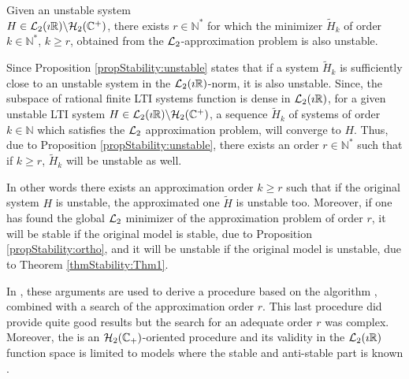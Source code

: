 \documentclass[graybox]{svmult}
\begin{document}
\begin{theorem} \label{thmStability:Thm1}
	Given an unstable system \\ $H\in {\mathcal{L}_{2}}(\imath\mathbb{R})\backslash {\mathcal{H}_{2}}(\mathbb{C}^+)$,  there exists  $r\in \mathbb{N}^*$ for which  the minimizer $\tilde H_k$ of order $k\in \mathbb{N}^*$, $k\geq r$, obtained from  the ${\mathcal{L}_{2}}$-approximation problem is also unstable.
\end{theorem} 
Since Proposition \ref{propStability:unstable} states that if a system $\tilde H_k$ is sufficiently close to an unstable system in the ${\mathcal{L}_{2}}(\imath\mathbb{R})$-norm, it is also unstable. Since, the subspace of rational finite LTI systems  function is dense in  ${\mathcal{L}_{2}}(\imath\mathbb{R})$, for a given unstable LTI system $H\in {\mathcal{L}_{2}}(\imath\mathbb{R})\backslash {\mathcal{H}_{2}}(\mathbb{C}^+)$,  a sequence $\tilde H_k$ of systems of order $k\in \mathbb N$ which satisfies the ${\mathcal{L}_{2}}$ approximation problem, will converge to $H$. Thus, due to Proposition \ref{propStability:unstable}, there exists an order $r\in\mathbb{N}^*$ such that if $k\geq r$, $\tilde H_k$ will be unstable as well.

In other words there exists an approximation order $k\geq r$ such that if the original system $H$ is unstable, the approximated one $\tilde H$ is unstable too. Moreover, if one has found the global ${\mathcal{L}_{2}}$ minimizer of the approximation problem of order $r$, it will be stable if the original model is stable, due to Proposition \ref{propStability:ortho}, and it will be unstable if the original model is unstable, due to Theorem \ref{thmStability:Thm1}. 

In \cite{PontesECC:2015}, these arguments are used to derive a procedure based on the \tfirka algorithm \cite{BeattieCDC:2012}, combined with a search of the approximation order $r$. This last procedure did provide quite good results but the search for an adequate order $r$ was complex. Moreover, the \tfirka is an ${\mathcal{H}_{2}}(\mathbb{C}_+)$-oriented procedure and its validity in the ${\mathcal{L}_{2}}(\imath\mathbb{R})$ function space is limited to models where the stable and anti-stable part is known \cite{Magruder:2010}. 
\end{document}
